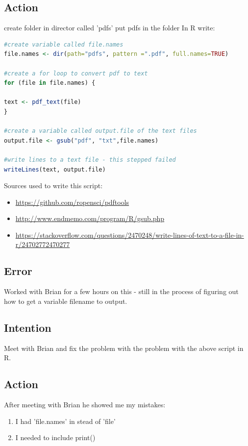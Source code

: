 \documentclass{article}
\begin{document}
\subsection{Action}
create folder in director called 'pdfs'
put pdfs in the folder
In R write: 
\begin{lstlisting}[language=R]
#create variable called file.names
file.names <- dir(path="pdfs", pattern =".pdf", full.names=TRUE)

#create a for loop to convert pdf to text 
for (file in file.names) {

text <- pdf_text(file)
}

#create a variable called output.file of the text files
output.file <- gsub("pdf", "txt",file.names)

#write lines to a text file - this stepped failed
writeLines(text, output.file)

\end{lstlisting}

Sources used to write this script:

\begin{itemize}
    \item \href{https://github.com/ropensci/pdftools}{https://github.com/ropensci/pdftools}
    \item \href{http://www.endmemo.com/program/R/gsub.php}{http://www.endmemo.com/program/R/gsub.php}
    \item \href{https://stackoverflow.com/questions/2470248/write-lines-of-text-to-a-file-in-r/24702772470277}{https://stackoverflow.com/questions/2470248/write-lines-of-text-to-a-file-in-r/24702772470277}
\end{itemize}

\subsection{Error}
Worked with Brian for a few hours on this - still in the process of figuring out how to get a variable filename to output. 

\subsection{Intention}
Meet with Brian and fix the problem with the problem with the above script in R.

\subsection{Action}
After meeting with Brian he showed me my mistakes:
\begin{enumerate}
    \item I had 'file.names' in stead of 'file'
    \item I needed to include print()
\end{enumerate}
\end{document}
